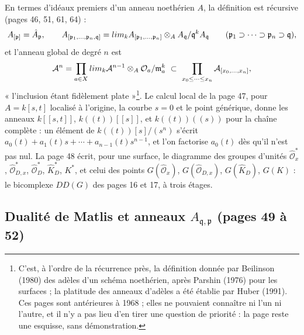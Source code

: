 \documentclass[11pt,a4paper]{article}
\begin{document}
En termes d'idéaux premiers d'un anneau noethérien $A$, la définition est
récursive (pages 46, 51, 61, 64) :
\[
A_{[\mathfrak{p}]} = \hat A_{\mathfrak{p}},
\qquad
A_{[\mathfrak{p}_1, \ldots, \mathfrak{p}_n, \mathfrak{q}]}
= \varprojlim_k A_{[\mathfrak{p}_1, \ldots, \mathfrak{p}_n]} \otimes_A
A_{\mathfrak{q}}/\mathfrak{q}^k A_{\mathfrak{q}}
\qquad (\mathfrak{p}_1 \supset \cdots \supset \mathfrak{p}_n \supset \mathfrak{q}),
\]
et l'anneau global de degré $n$ est
\[
\mathcal{A}^n = \prod_{a \in X} \varprojlim_k \mathcal{A}^{n-1} \otimes_A
\mathcal{O}_a/\mathfrak{m}_a^k \ \subset\ \prod_{x_0 \leq \cdots \leq x_n}
\mathcal{A}_{[x_0, \ldots, x_n]},
\]
« l'inclusion étant fidèlement plate »\footnote{C'est, à l'ordre de la récurrence
près, la définition donnée par Beilinson (1980) des adèles d'un schéma
noethérien, après Parshin (1976) pour les surfaces ; la platitude des anneaux
d'adèles a été établie par Huber (1991). Ces pages sont antérieures à 1968 ; elles
ne pouvaient connaître ni l'un ni l'autre, et il n'y a pas lieu d'en tirer une
question de priorité : la page reste une esquisse, sans démonstration.}.
Le calcul local de la page 47, pour $A = k[s,t]$ localisé à l'origine, la
courbe $s = 0$ et le point générique, donne les anneaux $k[[s,t]]$,
$k((t))[[s]]$, et $k((t))((s))$ pour la chaîne complète : un élément de
$k((t))[s]/(s^n)$ s'écrit $a_0(t) + a_1(t)s + \cdots + a_{n-1}(t)s^{n-1}$, et
l'on factorise $a_0(t)$ dès qu'il n'est pas nul. La page 48 écrit, pour une
surface, le diagramme des groupes d'unités $\hat{\mathcal{O}}^{*}_x$,
$\hat{\mathcal{O}}^{*}_{D,x}$, $\hat{\mathcal{O}}^{*}_D$, $\hat K^{*}_D$, $K^{*}$, et
celui des points $G(\hat{\mathcal{O}}_x)$, $G(\hat{\mathcal{O}}_{D,x})$,
$G(\hat K_D)$, $G(K)$ : le bicomplexe $DD(G)$ des pages 16 et 17, à trois étages.

\subsection*{Dualité de Matlis et anneaux $A_{\mathfrak{q},\mathfrak{p}}$ (pages 49 à 52)}
\end{document}
